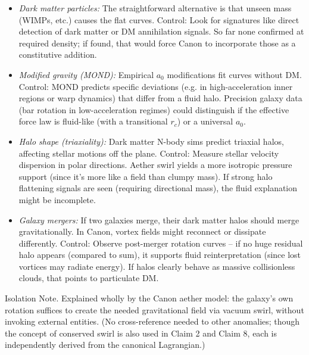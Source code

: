 \documentclass[11pt]{article}
\begin{document}
\begin{itemize}

\item 
\textit{Dark matter particles:} The straightforward alternative is that unseen mass (WIMPs, etc.) causes the flat curves. Control: Look for signatures like direct detection of dark matter or DM annihilation signals. So far none confirmed at required density; if found, that would force Canon to incorporate those as a constitutive addition.




\item 
\textit{Modified gravity (MOND):} Empirical $a_0$ modifications fit curves without DM. Control: MOND predicts specific deviations (e.g. in high-acceleration inner regions or warp dynamics) that differ from a fluid halo. Precision galaxy data (bar rotation in low-acceleration regimes) could distinguish if the effective force law is fluid-like (with a transitional $r_c$) or a universal $a_0$.




\item 
\textit{Halo shape (triaxiality):} Dark matter N-body sims predict triaxial halos, affecting stellar motions off the plane. Control: Measure stellar velocity dispersion in polar directions. Aether swirl yields a more isotropic pressure support (since it’s more like a field than clumpy mass). If strong halo flattening signals are seen (requiring directional mass), the fluid explanation might be incomplete.




\item 
\textit{Galaxy mergers:} If two galaxies merge, their dark matter halos should merge gravitationally. In Canon, vortex fields might reconnect or dissipate differently. Control: Observe post-merger rotation curves – if no huge residual halo appears (compared to sum), it supports fluid reinterpretation (since lost vortices may radiate energy). If halos clearly behave as massive collisionless clouds, that points to particulate DM.




\end{itemize}

Isolation Note. Explained wholly by the Canon aether model: the galaxy’s own rotation suffices to create the needed gravitational field via vacuum swirl, without invoking external entities. (No cross-reference needed to other anomalies; though the concept of conserved swirl is also used in Claim 2 and Claim 8, each is independently derived from the canonical Lagrangian.)
\end{document}
